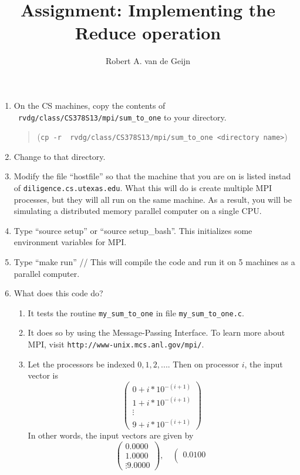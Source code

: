 \documentclass[10pt]{article}
\title{
Assignment: Implementing the Reduce operation
}
\author{
Robert A. van de Geijn
}
\date{
}
\begin{document}
\maketitle

\begin{enumerate}
\item
On the CS machines, copy the contents of {\tt ~rvdg/class/CS378S13/mpi/sum\_to\_one}
to your directory.  
\begin{quote}
({\tt cp -r ~rvdg/class/CS378S13/mpi/sum\_to\_one <directory name>})
\end{quote}
\item
Change to that directory.
\item
Modify the file ``hostfile'' so that the machine that you are on is listed instad of {\tt diligence.cs.utexas.edu}.  What this will do is create multiple MPI processes, but they will all run on the same machine.  As a result, you will be simulating a distributed memory parallel computer on a single CPU.
\item
Type ``source setup'' or ``source setup\_bash''.  This initializes
some environment variables for MPI.
\item
Type ``make run'' //
This will compile the code and run it on 5 machines as a parallel computer.
\item
What does this code do?
\begin{enumerate}
\item
It tests the routine {\tt my\_sum\_to\_one} in file {\tt my\_sum\_to\_one.c}.
\item
It does so by using the Message-Passing Interface.  To learn more
about MPI, visit
{\tt http://www-unix.mcs.anl.gov/mpi/}.
\item
Let the processors be indexed $ 0, 1, 2, ... $.
Then on processor $ i $, the input vector is
\[
\left( \begin{array}{c}
0 + i * 10^{-(i+1)} \\
1 + i * 10^{-(i+1)} \\
\vdots \\
9 + i * 10^{-(i+1)}
\end{array}
\right)
\]
In other words, the input vectors are given by
\[
\left( \begin{array}{r}
0.0000 \\
1.0000 \\
\vdots
9.0000
\end{array}
\right), \quad
%
\left( \begin{array}{r}
0.0100 \\

\end{array}\]
\end{enumerate}
\end{enumerate}
\end{document}
